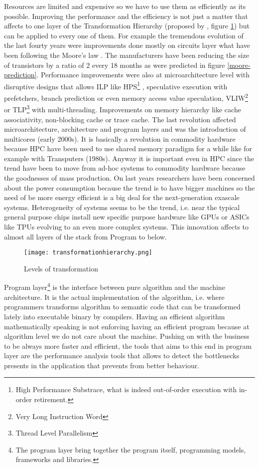 Resources are limited and expensive so we have to use them as efficiently
as its possible. Improving the performance and the efficiency is not just a 
matter that affects to one
layer of the Transformation Hierarchy (proposed by
\cite{transformationHierarchy}, figure \ref{fig:transformation_hierarchy}) 
but can be applied to every one of them. For example the
tremendous evolution of the last fourty years were improvements done mostly on
circuits layer what have been following the Moore's law \cite{moore:1965}. The
manufacturers have been reducing the size of transistors by a ratio of 2 every
18 months as were predicted in figure \ref{moore-prediction}. Performance improvements 
were also at microarchitecture level with
disruptive designs that allows ILP like HPS\footnote{High Performance Substrace,
what is indeed out-of-order execution with in-order retirement.}
\cite{Patt:1985:HNM:18927.18916}, speculative execution with prefetchers, 
branch prediction or even memory access value speculation,
VLIW\footnote{Very Long Instruction Word} or TLP\footnote{Thread Level
Parallelism} with multi-threading. Improvements on memory hierarchy like cache 
associativity, non-blocking cache or trace cache. The last revolution affected 
 microarchitecture, architecture and program layers and was the introduction
of multicores (early 2000s). It is basically a revolution in commodity hardware because HPC
have been used to use shared memory paradigm for a while like for example with
Transputers (1980s). Anyway it is important even in HPC since the trend have
been to move from ad-hoc systems to commodity hardware because the goodnesses of
mass production. On last years researchers have been concerned about the
power consumption because the trend is to have bigger machines so the need of be more
energy efficient is a big deal for the next-generation exascale systems.
Heterogeneity of systems seems to be the trend, i.e. near the typical general
purpose chips install new specific purpose hardware like GPUs or ASICs like
TPUs \cite{jouppi2017datacenter} evolving to an even more complex systems. This
innovation affects to almost all layers of the stack from Program to below. 

\begin{figure}
  \caption{Levels of transformation}
  \label{fig:transformation_hierarchy}
  \centering
    \texttt{[image: transformationhierarchy.png]}
\end{figure}

Program layer\footnote{The program layer bring together the program itself, 
programming models, frameworks and libraries.} is the interface between pure 
algorithm and the machine architecture. 
It is the actual implementation of the algorithm, i.e. where programmers
transforms algorithm to semantic code that can be transformed lately into
executable binary by compilers. Having an efficient algorithm mathematically 
speaking is not enforcing having an efficient program because at algorithm level 
we do not care about the machine. Pushing on with the business to be always more 
faster and efficient, the tools that aims to this end in program layer are the 
performance analysis tools that allows to detect the bottlenecks presents in the 
application that prevents from better behaviour.

